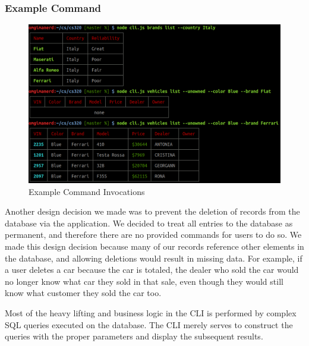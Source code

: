 \documentclass{math}
\begin{document}
\subsubsection*{Example Command}
\begin{figure}[H]
  \centering
  \includegraphics[width=16cm]{assets/phase3_example_command.png}
  \caption{Example Command Invocations}
\end{figure}
Another design decision we made was to prevent the deletion of records from the
database via the application. We decided to treat all entries to the database as
permanent, and therefore there are no provided commands for users to do so.
We made this design decision because many of our records reference other
elements in the database, and allowing deletions would result in missing data.
For example, if a user deletes a car because the car is totaled, the dealer who
sold the car would no longer know what car they sold in that sale, even though
they would still know what customer they sold the car too. \par
Most of the heavy lifting and business logic in the CLI is performed by
complex SQL queries executed on the database. The CLI merely serves to
construct the queries with the proper parameters and display the subsequent
results.
\end{document}
